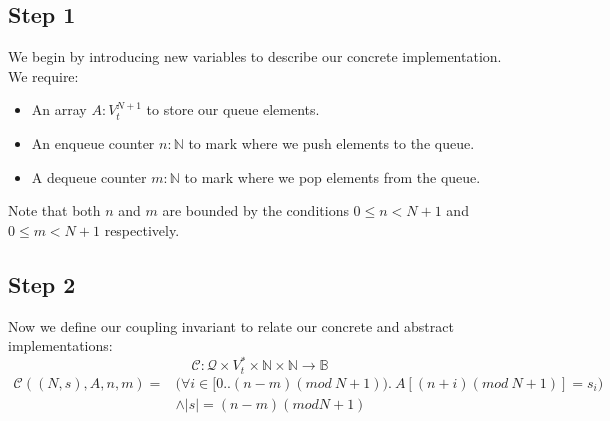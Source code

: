 \documentclass[a4paper]{scrartcl}
\newcommand{\N}{\mathbb{N}}
\newcommand{\C}{\mathcal{C}}
\newcommand{\Q}{\mathcal{Q}}
\begin{document}
{\subsection{Step 1}
%
We begin by introducing new variables to describe our concrete implementation. We require: \\
%
\begin{itemize}
\item An array $A : V_t^{N+1}$ to store our queue elements.
\item An enqueue counter $n : \N$ to mark where we push elements to the queue.
\item A dequeue counter $m : \N$ to mark where we pop elements from the queue.
\end{itemize}
%
Note that both $n$ and $m$ are bounded by the conditions $0 \leq n < N + 1$ and $0 \leq m < N + 1$ respectively.
%
\subsection{Step 2}
%
Now we define our coupling invariant to relate our concrete and abstract implementations:
%
 \[ \C : \Q \times V_t^* \times \N \times \N \to \mathbb{B} \]
\begin{align*}
 \C((N, s), A, n, m) = &\Big( \forall i \in \Big[0..(n - m)(mod ~N + 1)\Big). ~A[(n + i)(mod ~N + 1)] = s_i\Big) \\
 &\land |s| = (n-m)(mod N + 1) 
\end{align*}
%
%
}
\end{document}
